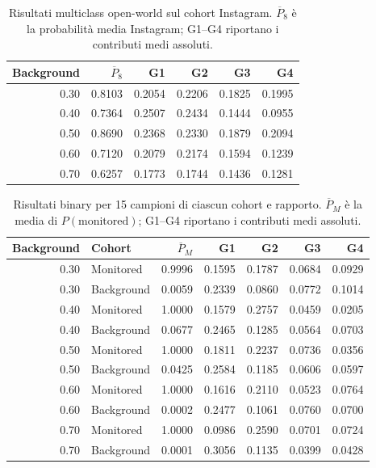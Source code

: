 \documentclass[11pt,a4paper]{article}
\begin{document}
\begin{table}[htbp]
\centering\small
\caption{Risultati multiclass open-world sul cohort Instagram. $\overline{P}_8$ è la probabilità media Instagram; G1--G4 riportano i contributi medi assoluti.}
\label{tab:open-multi-xai}
\begin{tabular}{rrrrrr}
\toprule
Background & $\overline{P}_8$ & G1 & G2 & G3 & G4 \\
\midrule
0.30 & 0.8103 & 0.2054 & 0.2206 & 0.1825 & 0.1995 \\
0.40 & 0.7364 & 0.2507 & 0.2434 & 0.1444 & 0.0955 \\
0.50 & 0.8690 & 0.2368 & 0.2330 & 0.1879 & 0.2094 \\
0.60 & 0.7120 & 0.2079 & 0.2174 & 0.1594 & 0.1239 \\
0.70 & 0.6257 & 0.1773 & 0.1744 & 0.1436 & 0.1281 \\
\bottomrule
\end{tabular}
\end{table}

\begin{table}[htbp]
\centering\small
\caption{Risultati binary per 15 campioni di ciascun cohort e rapporto. $\overline{P}_{M}$ è la media di $P(\mathrm{monitored})$; G1--G4 riportano i contributi medi assoluti.}
\label{tab:open-binary-xai}
\begin{tabular}{rlrrrrr}
\toprule
Background & Cohort & $\overline{P}_{M}$ & G1 & G2 & G3 & G4 \\
\midrule
0.30 & Monitored & 0.9996 & 0.1595 & 0.1787 & 0.0684 & 0.0929 \\
0.30 & Background & 0.0059 & 0.2339 & 0.0860 & 0.0772 & 0.1014 \\
0.40 & Monitored & 1.0000 & 0.1579 & 0.2757 & 0.0459 & 0.0205 \\
0.40 & Background & 0.0677 & 0.2465 & 0.1285 & 0.0564 & 0.0703 \\
0.50 & Monitored & 1.0000 & 0.1811 & 0.2237 & 0.0736 & 0.0356 \\
0.50 & Background & 0.0425 & 0.2584 & 0.1185 & 0.0606 & 0.0597 \\
0.60 & Monitored & 1.0000 & 0.1616 & 0.2110 & 0.0523 & 0.0764 \\
0.60 & Background & 0.0002 & 0.2477 & 0.1061 & 0.0760 & 0.0700 \\
0.70 & Monitored & 1.0000 & 0.0986 & 0.2590 & 0.0701 & 0.0724 \\
0.70 & Background & 0.0001 & 0.3056 & 0.1135 & 0.0399 & 0.0428 \\
\bottomrule
\end{tabular}
\end{table}
\end{document}
